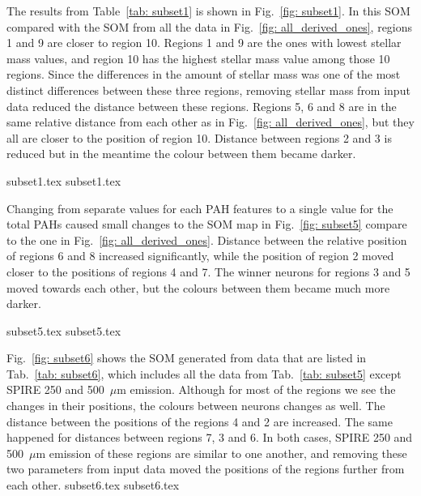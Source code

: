             The results from Table~\ref{tab: subset1} is shown in Fig.~\ref{fig: subset1}. 
            In this SOM compared with the SOM from all the data in Fig.~\ref{fig: all_derived_ones}, regions 1 and 9 are closer to region 10. 
            Regions 1 and 9 are the ones with lowest stellar mass values, and region 10 has the highest stellar mass value among those 10 regions. 
            Since the differences in the amount of stellar mass was one of the most distinct differences between these three regions, removing stellar mass from input data reduced the distance between these regions.
            Regions 5, 6 and 8 are in the same relative distance from each other as in Fig.~\ref{fig: all_derived_ones}, but they all are closer to the position of region 10.
            Distance between regions 2 and 3 is reduced but in the meantime the colour between them became darker.

            {subset1.tex}
            {subset1.tex}

            Changing from separate values for each PAH features to a single value for the total PAHs caused small changes to the SOM map in Fig.~\ref{fig: subset5} compare to the one in Fig.~\ref{fig: all_derived_ones}. 
            Distance between the relative position of regions 6 and 8 increased significantly, while the position of region 2 moved closer to the positions of regions 4 and 7.
            The winner neurons for regions 3 and 5 moved towards each other, but the colours between them became much more darker. 

            {subset5.tex}
            {subset5.tex}

            Fig.~\ref{fig: subset6} shows the SOM generated from data that are listed in Tab.~\ref{tab: subset6}, which includes all the data from Tab.~\ref{tab: subset5} except SPIRE 250 and 500~$\mu$m emission.
            Although for most of the regions we see the changes in their positions, the colours between neurons changes as well. 
            The distance between the positions of the regions 4 and 2 are increased.
            The same happened for distances between regions 7, 3 and 6.
            In both cases, SPIRE 250 and 500~$\mu$m emission of these regions are similar to one another, and removing these two parameters from input data moved the positions of the regions further from each other. 
            {subset6.tex}
            {subset6.tex}
            
